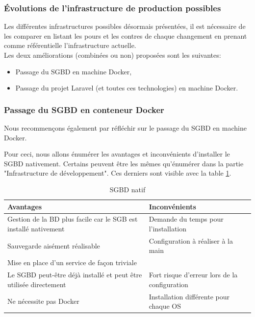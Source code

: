 \documentclass[
    iai, %
    il, %
]{heig-tb}
\begin{document}
\subsubsection{Évolutions de l'infrastructure de production possibles}
Les différentes infrastructures possibles désormais présentées, il est nécessaire de les comparer en listant les pours et les contres de chaque changement en prenant comme référentielle l'infrastructure actuelle.\\
Les deux améliorations (combinées ou non) proposées sont les suivantes:
\begin{itemize}
    \item Passage du SGBD en machine Docker,
    \item Passage du projet Laravel (et toutes ces technologies) en machine Docker.
\end{itemize}

\subsubsection{Passage du SGBD en conteneur Docker}
Nous recommençons également par réfléchir sur le passage du SGBD en machine Docker.

Pour ceci, nous allons énumérer les avantages et inconvénients d'installer le SGBD nativement.
Certains peuvent être les mêmes qu'énumérer dans la partie "Infrastructure de
développement". Ces derniers sont visible avec la table \ref{prod-db-native}.

\begin{table}[h]
    \begin{center}
        \caption{SGBD natif \label{prod-db-native}}
        \begin{tabularx}{1.0\textwidth} {X|X}
            Avantages                                                         & Inconvénients                          \\ \hline
            Gestion de la BD plus facile car le SGB est installé nativement   & Demande du temps
            pour l'installation                                                                                        \\
            Sauvegarde aisément réalisable                                    & Configuration à réaliser à la main     \\
            Mise en place d'un service de façon triviale                      &                                        \\
            Le SGBD peut-être déjà installé et peut être utilisée directement & Fort risque
            d'erreur lors de la configuration                                                                          \\
            Ne nécessite pas Docker                                           & Installation différente pour chaque OS \\
        \end{tabularx}
    \end{center}
\end{table}
\end{document}
